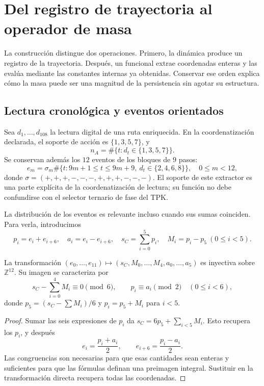 \section{Del registro de trayectoria al operador de masa}
\label{vi:sec:operador-masa}

La construcción distingue dos operaciones. Primero, la dinámica produce
un registro de la trayectoria. Después, un funcional extrae coordenadas
enteras y las evalúa mediante las constantes internas ya obtenidas.
Conservar ese orden explica cómo la masa puede ser una magnitud de la
persistencia sin agotar su estructura.

\subsection{Lectura cronológica y eventos orientados}

Sea \(d_1,\ldots,d_{108}\) la lectura digital de una ruta enriquecida.
En la coordenatización declarada, el soporte de acción es \(\{1,3,5,7\}\), y
\[
 n_A=\#\{t:d_t\in\{1,3,5,7\}\}.
\]
Se conservan además los \(12\) eventos de los bloques de \(9\) pasos:
\[
 e_m=\sigma_m\#\{t:9m+1\le t\le9m+9,\ d_t\in\{2,4,6,8\}\},
 \quad 0\le m<12,
\]
donde \(\sigma=(+,+,+,-,-,-,+,+,+,-,-,-)\). El soporte de este
extractor es una parte explícita de la coordenatización de lectura; su función no
debe confundirse con el selector ternario de fase del TPK.

La distribución de los eventos es relevante incluso cuando sus sumas
coinciden. Para verla, introducimos
\[
 p_i=e_i+e_{i+6},\quad a_i=e_i-e_{i+6},\quad
 s_C=\sum_{i=0}^{5}p_i,\quad M_i=p_i-p_5\ (0\le i<5).
\]

\begin{proposition}
\label{vi:prop:eventos}
La transformación \((e_0,\ldots,e_{11})\mapsto(s_C,M_0,\ldots,M_4,a_0,\ldots,a_5)\)
es inyectiva sobre \(\mathbb Z^{12}\). Su imagen se caracteriza por
\[
 s_C-\sum_{i=0}^4M_i\equiv0\pmod6,
 \qquad p_i\equiv a_i\pmod2\quad(0\le i<6),
\]
donde \(p_5=(s_C-\sum M_i)/6\) y \(p_i=p_5+M_i\) para \(i<5\).
\end{proposition}
\begin{proof}
Sumar las seis expresiones de \(p_i\) da
\(s_C=6p_5+\sum_{i<5}M_i\). Esto recupera los \(p_i\), y después
\[
 e_i=\frac{p_i+a_i}{2},\qquad
 e_{i+6}=\frac{p_i-a_i}{2}.
\]
Las congruencias son necesarias para que esas cantidades sean enteras y
suficientes para que las fórmulas definan una preimagen integral. Sustituir
en la transformación directa recupera todas las coordenadas.
\end{proof}

